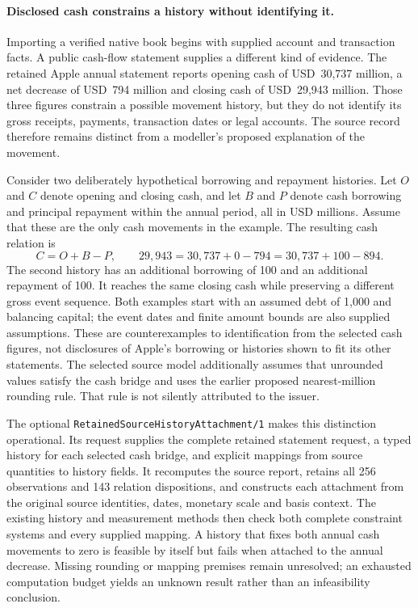 \paragraph{Disclosed cash constrains a history without identifying it.}
Importing a verified native book begins with supplied account and transaction
facts. A public cash-flow statement supplies a different kind of evidence.
The retained Apple annual statement reports opening cash of USD~30,737 million,
a net decrease of USD~794 million and closing cash of USD~29,943 million.
Those three figures constrain a possible movement history, but they do not
identify its gross receipts, payments, transaction dates or legal accounts.
The source record therefore remains distinct from a modeller's proposed
explanation of the movement.

Consider two deliberately hypothetical borrowing and repayment histories.
Let \(O\) and \(C\) denote opening and closing cash, and let \(B\) and \(P\)
denote cash borrowing and principal repayment within the annual period, all
in USD millions. Assume that these are the only cash movements in the example.
The resulting cash relation is
\[
  C=O+B-P,\qquad
  29{,}943=30{,}737+0-794
           =30{,}737+100-894.
\]
The second history has an additional borrowing of 100 and an additional
repayment of 100. It reaches the same closing cash while preserving a different
gross event sequence. Both examples start with an assumed debt of 1,000 and
balancing capital; the event dates and finite amount bounds are also supplied
assumptions. These are counterexamples to identification from the selected
cash figures, not disclosures of Apple's borrowing or histories shown to fit
its other statements. The selected source model additionally assumes that
unrounded values satisfy the cash bridge and uses the earlier proposed
nearest-million rounding rule. That rule is not silently attributed to the issuer.

The optional \texttt{RetainedSourceHistoryAttachment/1} makes this distinction
operational. Its request supplies the complete retained statement request,
a typed history for each selected cash bridge, and explicit mappings from
source quantities to history fields. It recomputes the source report, retains
all 256 observations and 143 relation dispositions, and constructs each
attachment from the original source identities, dates, monetary scale and
basis context. The existing history and measurement methods then check both
complete constraint systems and every supplied mapping. A history that fixes
both annual cash movements to zero is feasible by itself but fails when
attached to the annual decrease. Missing rounding or mapping premises remain
unresolved; an exhausted computation budget yields an unknown result rather
than an infeasibility conclusion.

